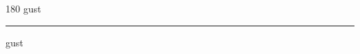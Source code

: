 
\begin{frame}
\begin{center}
\begin{turn}{180}
{\fontsize{2.5cm}{1em}\selectfont gust}
\end{turn}
\vspace{1em}\par  
\hrule
\vspace{1em}\par  
{\fontsize{2.5cm}{1em}\selectfont gust}
\end{center}
\end{frame}
